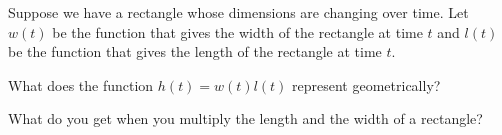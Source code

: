 \documentclass{ximera}
\begin{document}
\begin{question}
Suppose we have a rectangle whose dimensions are changing over time. Let $w(t)$ be the function that gives the width of the rectangle at time $t$ and $l(t)$ be the function that gives the length of the rectangle at time $t$.

What does the function $h(t)=w(t)l(t)$ represent geometrically?

\begin{multipleChoice}
\end{multipleChoice}
\begin{hint}
What do you get when you multiply the length and the width of a rectangle? 
\end{hint}

\end{question}
\end{document}
